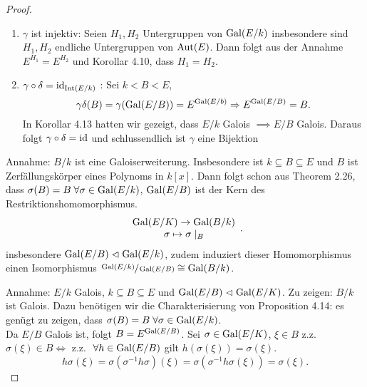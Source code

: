 \begin{proof}
	\begin{enumerate}[(1)]
		\item $\gamma$ ist injektiv: Seien $H_1, H_2$ Untergruppen von $\operatorname{Gal}(E / k)$ insbesondere sind $H_1, H_2$ endliche Untergruppen von $\operatorname{Aut}(E)$.
			Dann folgt aus der Annahme $E^{H_1} = E^{H_2}$  und Korollar 4.10, dass  $H_1 = H_2$.
		\item $\gamma \circ \delta = \operatorname{id}_{\operatorname{Int}(E / k)}$ : Sei $k < B < E$,
			\[
				\gamma \delta(B) =  \gamma(\operatorname{Gal}(E / B)) = E^{\operatorname{Gal}(E / b)} \Rightarrow E^{\operatorname{Gal}( E / B)} = B
			.\]
			In Korollar 4.13 hatten wir gezeigt, dass $E / k$ Galois $\implies E / B$ Galois. 
			Daraus folgt $\gamma \circ \delta = \operatorname{id}$ und schlussendlich ist $\gamma$ eine Bijektion
	\end{enumerate}
	Annahme: $B / k$ ist eine Galoiserweiterung. Insbesondere ist $k \subseteq B \subseteq E$ und $B$ ist Zerfällungskörper eines Polynoms in $k[x]$.
	Dann folgt schon aus Theorem 2.26, dass $\sigma(B) = B \forall \sigma \in \gal(E / k)$, $\operatorname{Gal}(E / B)$ ist der Kern des Restriktionshomomorphismus.
	\[
		\begin{array}{c} \operatorname{Gal}(E / K) \to \operatorname{Gal}( B / k)\\ \sigma \mapsto \sigma \mid_{B}\\ \end{array}
	.\] 
	insbesondere $\operatorname{Gal}(E / B) \vartriangleleft \operatorname{Gal}(E / k)$, zudem induziert dieser Homomorphismus einen Isomorphismus  $\sfrac{\operatorname{Gal}(E / k)}{\operatorname{Gal}(E / B)} \cong \operatorname{Gal}(B / k)$.

	Annahme: $E / k$ Galois, $k \subseteq B \subseteq E$ und $\operatorname{Gal}(E / B) \vartriangleleft \operatorname{Gal}(E / K)$. Zu zeigen: $B / k$ ist Galois. 
	Dazu benötigen wir die Charakterisierung von Proposition 4.14: es genügt zu zeigen, dass $\sigma(B) = B \forall \sigma \in \gal(E / k)$.\\
	Da $E / B$ Galois ist, folgt $B = E^{\operatorname{Gal}(E / B)}$.
	Sei $\sigma \in \operatorname{Gal}(E / K)$, $\xi \in B$ z.z. $\sigma(\xi) \in B \Leftrightarrow $ z.z. $\forall h \in \gal(E / B)$ gilt $h(\sigma(\xi)) = \sigma(\xi)$.
	\[
		h \sigma(\xi) = \sigma (\sigma^{-1} h \sigma)(\xi) = \sigma(\sigma^{-1} h \sigma(\xi)) = \sigma(\xi)
	.\] 
\end{proof}

































